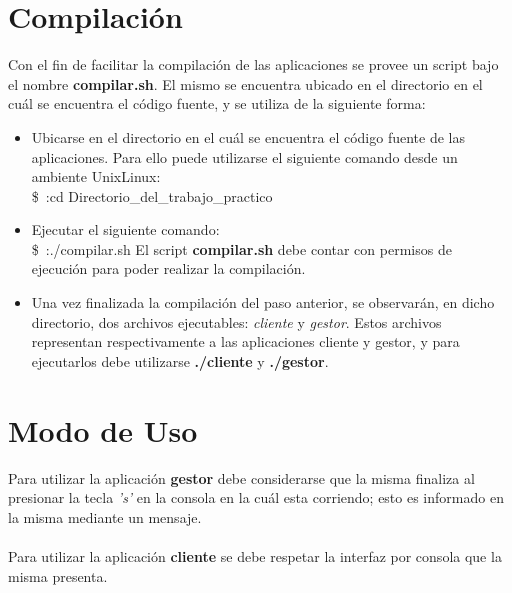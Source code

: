 \documentclass[11pt]{article}
\begin{document}
\newpage
\section{Compilaci\'on}
Con el fin de facilitar la compilaci\'on de las aplicaciones se provee un script bajo el nombre {\bf compilar.sh}. El mismo se encuentra ubicado en 
el directorio en el cu\'al se encuentra el c\'odigo fuente, y se utiliza de la siguiente forma:
\begin{itemize}
 \item Ubicarse en el directorio en el cu\'al se encuentra el c\'odigo fuente de las aplicaciones. Para ello puede utilizarse el siguiente 
comando desde un ambiente Unix\/Linux:\\
\$~:cd Directorio\_del\_trabajo\_practico
\item Ejecutar el siguiente comando: \\
\$~:./compilar.sh
\subitem * El script {\bf compilar.sh} debe contar con permisos de ejecuci\'on para poder realizar la compilaci\'on.
\item Una vez finalizada la compilaci\'on del paso anterior, se observar\'an, en dicho directorio, dos archivos ejecutables: \textit{cliente} y \textit{gestor}. 
Estos archivos representan respectivamente a las aplicaciones cliente y gestor, y para ejecutarlos debe utilizarse {\bf ./cliente} y {\bf ./gestor}. 
\end{itemize}


\section{Modo de Uso}
Para utilizar la aplicaci\'on {\bf gestor} debe considerarse que la misma finaliza al presionar la tecla \textit{'s'} en la consola en la cu\'al esta corriendo; 
esto es informado en la misma mediante un mensaje. \\ \\
Para utilizar la aplicaci\'on {\bf cliente} se debe respetar la interfaz por consola que la misma presenta. \\
\end{document}
